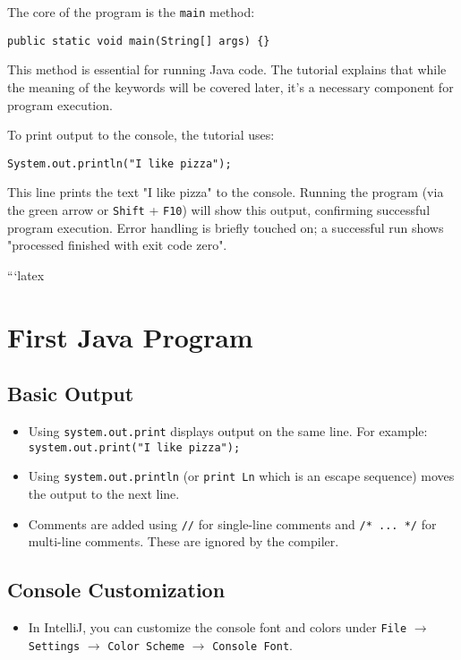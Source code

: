 \documentclass{article}
\begin{document}
The core of the program is the \texttt{main} method:

\texttt{public static void main(String[] args) \{\}}

This method is essential for running Java code.  The tutorial explains that while the meaning of the keywords will be covered later, it's a necessary component for program execution.

To print output to the console, the tutorial uses:

\texttt{System.out.println("I like pizza");}

This line prints the text "I like pizza" to the console. Running the program (via the green arrow or \texttt{Shift} + \texttt{F10}) will show this output, confirming successful program execution.  Error handling is briefly touched on; a successful run shows "processed finished with exit code zero".


```latex
\section{First Java Program}

\subsection{Basic Output}

\begin{itemize}
    \item Using \texttt{system.out.print} displays output on the same line.  For example: \texttt{system.out.print("I like pizza");}
    \item Using \texttt{system.out.println} (or \texttt{print Ln} which is an escape sequence) moves the output to the next line.
    \item Comments are added using \texttt{//} for single-line comments and \texttt{/* ... */} for multi-line comments.  These are ignored by the compiler.
\end{itemize}

\subsection{Console Customization}

\begin{itemize}
    \item In IntelliJ, you can customize the console font and colors under \texttt{File} $\rightarrow$ \texttt{Settings} $\rightarrow$ \texttt{Color Scheme} $\rightarrow$ \texttt{Console Font}.
\end{itemize}
\end{document}
